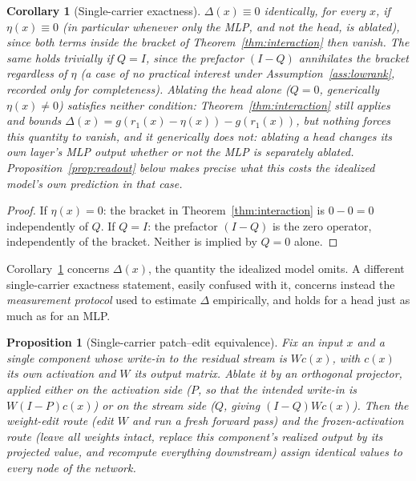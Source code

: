 \documentclass[11pt,a4paper]{article}
\newtheorem{proposition}{Proposition}
\newtheorem{corollary}{Corollary}
\begin{document}
\begin{corollary}[Single-carrier exactness]
\label{cor:exactness}
$\Delta(x)\equiv0$ identically, for every $x$, if $\eta(x)\equiv0$ (in
particular whenever only the MLP, and not the head, is ablated), since both
terms inside the bracket of Theorem~\ref{thm:interaction} then vanish. The
same holds trivially if $Q=I$, since the prefactor $(I-Q)$ annihilates the
bracket regardless of $\eta$ (a case of no practical interest under
Assumption~\ref{ass:lowrank}, recorded only for completeness). Ablating the
head \emph{alone} ($Q=0$, generically $\eta(x)\ne0$) satisfies neither
condition: Theorem~\ref{thm:interaction} still applies and bounds
$\Delta(x)=g(r_1(x)-\eta(x))-g(r_1(x))$, but nothing forces this quantity to
vanish, and it generically does not: ablating a head changes its own
layer's MLP output whether or not the MLP is separately ablated.
Proposition~\ref{prop:readout} below makes precise what this costs the
idealized model's own prediction in that case.
\end{corollary}

\begin{proof}
If $\eta(x)=0$: the bracket in Theorem~\ref{thm:interaction} is $0-0=0$
independently of $Q$. If $Q=I$: the prefactor $(I-Q)$ is the zero operator,
independently of the bracket. Neither is implied by $Q=0$ alone.
\end{proof}

Corollary~\ref{cor:exactness} concerns $\Delta(x)$, the quantity the idealized
model omits. A different single-carrier exactness statement, easily confused
with it, concerns instead the \emph{measurement protocol} used to estimate
$\Delta$ empirically, and holds for a head just as much as for an MLP.

\begin{proposition}[Single-carrier patch--edit equivalence]
\label{prop:patchedit}
Fix an input $x$ and a single component whose write-in to the residual stream
is $Wc(x)$, with $c(x)$ its own activation and $W$ its output matrix. Ablate
it by an orthogonal projector, applied either on the activation side ($P$, so
that the intended write-in is $W(I-P)c(x)$) or on the stream side ($Q$, giving
$(I-Q)Wc(x)$). Then the \emph{weight-edit} route (edit $W$ and run a fresh
forward pass) and the \emph{frozen-activation} route (leave all weights
intact, replace this component's realized output by its projected value, and
recompute everything downstream) assign identical values to every node of
the network.
\end{proposition}
\end{document}
